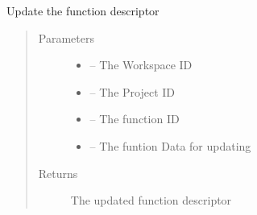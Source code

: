 \documentclass[letterpaper,10pt,english]{sphinxmanual}
\begin{document}
\begin{fulllineitems}
\label{_source/son_editor.impl:son_editor.impl.functionsimpl.update_function}
Update the function descriptor
\begin{quote}\begin{description}
\item[{Parameters}] \leavevmode\begin{itemize}
\item {} 
 -- The Workspace ID

\item {} 
 -- The Project ID

\item {} 
 -- The function ID

\item {} 
 -- The funtion Data for updating

\end{itemize}

\item[{Returns}] \leavevmode
The updated function descriptor

\end{description}\end{quote}

\end{fulllineitems}

\end{document}
